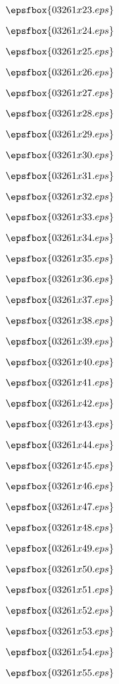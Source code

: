 \vfil \eject
$$\epsfbox{03261x23.eps}$$

\vfil \eject
$$\epsfbox{03261x24.eps}$$

\vfil \eject
$$\epsfbox{03261x25.eps}$$

\vfil \eject
$$\epsfbox{03261x26.eps}$$

\vfil \eject
$$\epsfbox{03261x27.eps}$$

\vfil \eject
$$\epsfbox{03261x28.eps}$$

\vfil \eject
$$\epsfbox{03261x29.eps}$$

\vfil \eject
$$\epsfbox{03261x30.eps}$$

\vfil \eject
$$\epsfbox{03261x31.eps}$$

\vfil \eject
$$\epsfbox{03261x32.eps}$$

\vfil \eject
$$\epsfbox{03261x33.eps}$$

\vfil \eject
$$\epsfbox{03261x34.eps}$$

\vfil \eject
$$\epsfbox{03261x35.eps}$$

\vfil \eject
$$\epsfbox{03261x36.eps}$$

\vfil \eject
$$\epsfbox{03261x37.eps}$$

\vfil \eject
$$\epsfbox{03261x38.eps}$$

\vfil \eject
$$\epsfbox{03261x39.eps}$$

\vfil \eject
$$\epsfbox{03261x40.eps}$$

\vfil \eject
$$\epsfbox{03261x41.eps}$$

\vfil \eject
$$\epsfbox{03261x42.eps}$$

\vfil \eject
$$\epsfbox{03261x43.eps}$$

\vfil \eject
$$\epsfbox{03261x44.eps}$$

\vfil \eject
$$\epsfbox{03261x45.eps}$$

\vfil \eject
$$\epsfbox{03261x46.eps}$$

\vfil \eject
$$\epsfbox{03261x47.eps}$$

\vfil \eject
$$\epsfbox{03261x48.eps}$$

\vfil \eject
$$\epsfbox{03261x49.eps}$$

\vfil \eject
$$\epsfbox{03261x50.eps}$$

\vfil \eject
$$\epsfbox{03261x51.eps}$$

\vfil \eject
$$\epsfbox{03261x52.eps}$$

\vfil \eject
$$\epsfbox{03261x53.eps}$$

\vfil \eject
$$\epsfbox{03261x54.eps}$$

\vfil \eject
$$\epsfbox{03261x55.eps}$$

